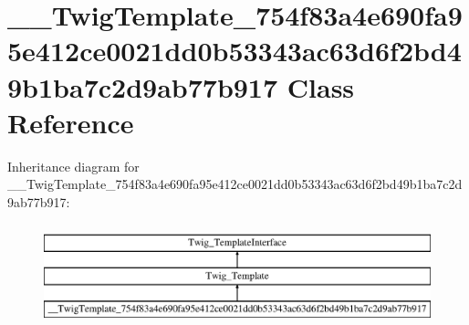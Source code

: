 \hypertarget{class_____twig_template__754f83a4e690fa95e412ce0021dd0b53343ac63d6f2bd49b1ba7c2d9ab77b917}{}\section{\+\_\+\+\_\+\+Twig\+Template\+\_\+754f83a4e690fa95e412ce0021dd0b53343ac63d6f2bd49b1ba7c2d9ab77b917 Class Reference}
\label{class_____twig_template__754f83a4e690fa95e412ce0021dd0b53343ac63d6f2bd49b1ba7c2d9ab77b917}
Inheritance diagram for \+\_\+\+\_\+\+Twig\+Template\+\_\+754f83a4e690fa95e412ce0021dd0b53343ac63d6f2bd49b1ba7c2d9ab77b917\+:\begin{figure}[H]
\begin{center}
\leavevmode
\includegraphics[height=3.000000cm]{class_____twig_template__754f83a4e690fa95e412ce0021dd0b53343ac63d6f2bd49b1ba7c2d9ab77b917}
\end{center}
\end{figure}
